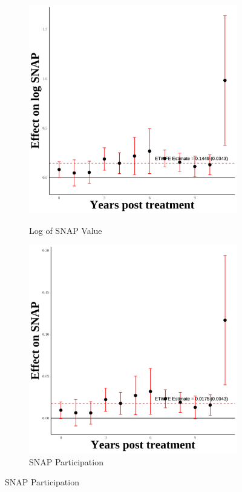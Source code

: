 \documentclass[12pt,english]{article}
\begin{document}
\begin{figure}[H]
  \vspace{0.3cm} %

  \begin{subfigure}[b]{0.3\textwidth}
    \centering
    \caption{Log of SNAP Value}
    \includegraphics[width=\linewidth]{figures/plot37-ln_snap_event_study-secgen-hw.png}
    \label{fig:ln-snap-secgen-hw}
  \end{subfigure}
  \hfill
  \begin{subfigure}[b]{0.3\textwidth}
    \centering
    \caption{SNAP Participation}
    \includegraphics[width=\linewidth]{figures/plot38-snap_event_study-secgen-hw.png}

\end{subfigure}
\end{figure}
\end{document}
